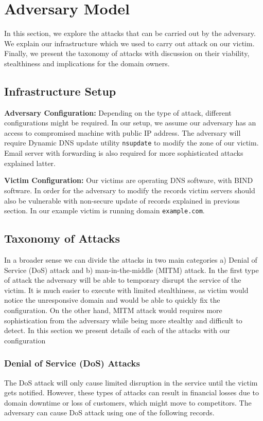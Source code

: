 \section{Adversary Model}
In this section, we explore the attacks that can be carried out by the adversary. We explain our infrastructure which we used to carry out attack on our victim. Finally, we present the taxonomy of attacks with discussion on their viability, stealthiness and  implications for the domain owners.

\subsection{Infrastructure Setup}
\textbf{Adversary Configuration:} Depending on the type of attack, different configurations might be required. In our setup, we assume our adversary has an access to compromised machine with public IP address. The adversary will require Dynamic DNS update utility \texttt{nsupdate} to modify the zone of our victim. Email server with forwarding is also required for more sophisticated attacks explained latter. 

\textbf{Victim Configuration:} Our victims are operating  DNS software, with BIND software. In order for the adversary to modify the records victim servers should also be vulnerable with non-secure update of records explained in previous section. In our example victim is running domain \texttt{example.com}. 


\subsection{Taxonomy of Attacks}

In a broader sense we can divide the attacks in two main categories a) Denial of Service (DoS) attack and b) man-in-the-middle (MITM) attack. In the first type of attack the adversary will be able to temporary disrupt the service of the victim. It is much easier to execute with limited stealthiness, as victim would notice the unresponsive domain and would be able to quickly fix the configuration. On the other hand, MITM attack would requires more sophistication from the adversary while being more stealthy and difficult to detect. In this section we present details of each of the attacks with our configuration 

\subsubsection{Denial of Service (DoS) Attacks} 
The DoS attack will only cause limited disruption in the service until the victim gets notified. However, these types of attacks can result in financial losses due to domain downtime or loss of customers, which might move to competitors. The adversary can cause DoS attack using one of the following records. 

